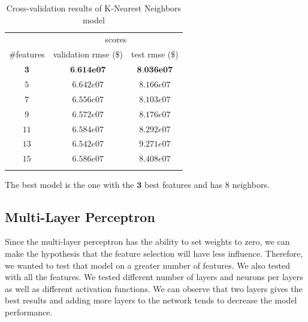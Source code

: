 \begin{table}[H]
	\centering
	\begin{tabular}{ccc} \toprule
	  & \multicolumn {2}{c}{scores} \\\cmidrule(lr) {2-3}
	  \#features         & validation rmse (\$)             & test rmse (\$) \\\hline
	  $\textbf{3}$      & $\textbf{6.614e07}$               & $\textbf{8.036e07}$ \\
	  $5$        		& $6.642e07$                        & $8.166e07$ \\
	  $7$        		& $6.556e07$                        & $8.103e07$ \\
	  $9$             	& $6.572e07$                        & $8.176e07$ \\
	  $11$             	& $6.584e07$                        & $8.292e07$ \\
	  $13$             	& $6.542e07$                        & $9.271e07$ \\
	  $15$             	& $6.586e07$                        & $8.408e07$ \\
	  \\\hline
	\end{tabular}
	\caption{Cross-validation results of K-Nearest Neighbors model}
	\label{tab:knn-results}
\end{table}

The best model is the one with the $\textbf{3}$ best features and has $8$ neighbors.

\subsection{Multi-Layer Perceptron}

Since the multi-layer perceptron has the ability to set weights to zero, we can make the hypothesis that the feature selection will have less influence. Therefore, we wanted to test that model on a greater number of features. We also tested with all the features. We tested different number of layers and neurons per layers as well as different activation functions. We can observe that two layers gives the best results and adding more layers to the network tends to decrease the model performance.

